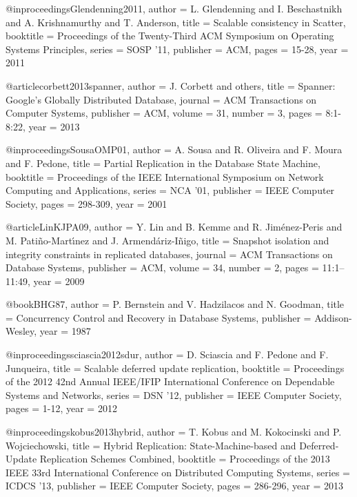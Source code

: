 @inproceedings{Glendenning2011,
   author    = {L. Glendenning and I. Beschastnikh and A. Krishnamurthy and T. Anderson},
   title     = {Scalable consistency in {Scatter}},
   booktitle = {Proceedings of the Twenty-Third ACM Symposium on Operating Systems Principles},
   series    = {SOSP '11},
   publisher = {ACM},
   pages     = {15-28},
   year      = {2011}
}

@article{corbett2013spanner,
   author    = {J. Corbett and others},
   title     = {Spanner: Google's Globally Distributed Database},
   journal   = {ACM Transactions on Computer Systems},
   publisher = {ACM},
   volume    = {31},
   number    = {3},
   pages     = {8:1-8:22},
   year      = {2013}
}

@inproceedings{SousaOMP01,
   author    = {A. Sousa and R. Oliveira and F. Moura and F. Pedone},
   title     = {Partial Replication in the Database State Machine},
   booktitle = {Proceedings of the IEEE International Symposium on Network Computing and Applications},
   series    = {NCA '01},
   publisher = {{IEEE} Computer Society},
   pages     = {298-309},
   year      = {2001}
}

@article{LinKJPA09,
   author    = {Y. Lin and B. Kemme and R. Jim{\'e}nez-Peris and M. Pati{\~n}o-Mart\'{\i}nez and J. Armend{\'a}riz-I{\~n}igo},
   title     = {Snapshot isolation and integrity constraints in replicated databases},
   journal   = {ACM Transactions on Database Systems},
   publisher = {ACM},
   volume    = {34},
   number    = {2},
   pages     = {11:1--11:49},
   year      = {2009}
}


@book{BHG87,
	author    = {P. Bernstein and V. Hadzilacos and N. Goodman},
	title     = {Concurrency Control and Recovery in Database Systems},
	publisher = {Addison-Wesley},
	year      = {1987}
}

@inproceedings{sciascia2012sdur,
   author    = {D. Sciascia and F. Pedone and F. Junqueira},
   title     = {Scalable deferred update replication},
   booktitle = {Proceedings of the 2012 42nd Annual IEEE/IFIP International Conference on Dependable Systems and Networks},
   series    = {DSN '12},
   publisher = {{IEEE} Computer Society},
   pages     = {1-12},
   year      = {2012}
}

@inproceedings{kobus2013hybrid,
   author    = {T. Kobus and M. Kokocinski and P. Wojciechowski},
   title     = {Hybrid Replication: State-Machine-based and Deferred-Update Replication Schemes Combined},
   booktitle = {Proceedings of the 2013 IEEE 33rd International Conference on Distributed Computing Systems},
   series    = {ICDCS '13},
   publisher = {{IEEE} Computer Society},
   pages     = {286-296},
   year      = {2013}
}

